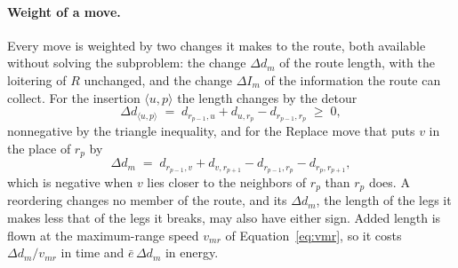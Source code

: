 \documentclass[11pt]{article}
\begin{document}
\paragraph{Weight of a move.}
Every move is weighted by two changes it makes to the route, both available without solving the subproblem: the change $\Delta d_m$ of the route length, with the loitering of $R$ unchanged, and the change $\Delta I_m$ of the information the route can collect. For the insertion $\langle u, p \rangle$ the length changes by the detour
\begin{equation}\label{eq:detour}
    \Delta d_{\langle u, p \rangle} \;=\; d_{r_{p-1}, u} + d_{u, r_p} - d_{r_{p-1}, r_p} \;\ge\; 0 ,
\end{equation}
nonnegative by the triangle inequality, and for the Replace move that puts $v$ in the place of $r_p$ by
\begin{equation}\label{eq:replace-weight}
    \Delta d_m \;=\; d_{r_{p-1}, v} + d_{v, r_{p+1}} - d_{r_{p-1}, r_p} - d_{r_p, r_{p+1}} ,
\end{equation}
which is negative when $v$ lies closer to the neighbors of $r_p$ than $r_p$ does. A reordering changes no member of the route, and its $\Delta d_m$, the length of the legs it makes less that of the legs it breaks, may also have either sign. Added length is flown at the maximum-range speed $v_{mr}$ of Equation~\eqref{eq:vmr}, so it costs $\Delta d_m / v_{mr}$ in time and $\bar{e}\,\Delta d_m$ in energy.
\end{document}
